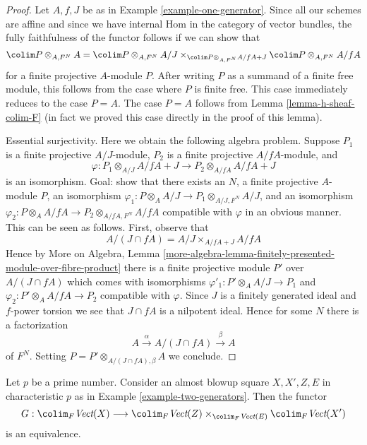 \begin{proof}
Let $A, f, J$ be as in Example \ref{example-one-generator}.
Since all our schemes are affine and since we have internal
Hom in the category of vector bundles, the fully faithfulness
of the functor follows if we can show that
$$
\colim P \otimes_{A, F^N} A =
\colim P \otimes_{A, F^N} A/J
\times_{\colim P \otimes_{A, F^N} A/fA + J}
\colim P \otimes_{A, F^N} A/fA
$$
for a finite projective $A$-module $P$. After writing $P$ as a summand
of a finite free module, this follows from the case where $P$ is finite
free. This case immediately reduces to the case $P = A$. The case
$P = A$ follows from Lemma \ref{lemma-h-sheaf-colim-F}
(in fact we proved this case directly in the proof of this lemma).

\medskip\noindent
Essential surjectivity. Here we obtain the following algebra problem.
Suppose $P_1$ is a finite projective $A/J$-module,
$P_2$ is a finite projective $A/fA$-module, and
$$
\varphi :
P_1 \otimes_{A/J} A/fA + J
\longrightarrow
P_2 \otimes_{A/fA} A/fA + J
$$
is an isomorphism. Goal: show that there exists an $N$, a finite
projective $A$-module $P$, an isomorphism
$\varphi_1 : P \otimes_A A/J \to P_1 \otimes_{A/J, F^N} A/J$,
and an isomorphism
$\varphi_2 : P \otimes_A A/fA \to P_2 \otimes_{A/fA, F^N} A/fA$
compatible with $\varphi$ in an obvious manner.
This can be seen as follows. First, observe that
$$
A/(J \cap fA) = A/J \times_{A/fA + J} A/fA
$$
Hence by More on Algebra, Lemma
\ref{more-algebra-lemma-finitely-presented-module-over-fibre-product}
there is a finite projective module $P'$ over
$A/(J \cap fA)$ which comes with isomorphisms
$\varphi'_1 : P' \otimes_A A/J \to P_1$ and
$\varphi_2 : P' \otimes_A A/fA \to P_2$
compatible with $\varphi$. Since $J$ is a finitely generated ideal and
$f$-power torsion we see that $J \cap fA$ is a nilpotent
ideal. Hence for some $N$ there is a factorization
$$
A \xrightarrow{\alpha} A/(J \cap fA) \xrightarrow{\beta} A
$$
of $F^N$. Setting $P = P' \otimes_{A/(J \cap fA), \beta} A$
we conclude.
\end{proof}

\begin{lemma}
\label{lemma-vector-bundle-II}
Let $p$ be a prime number. Consider an almost blowup square $X, X', Z, E$
in characteristic $p$ as in Example \ref{example-two-generators}.
Then the functor
$$
G :
\colim_F \textit{Vect}(X)
\longrightarrow
\colim_F \textit{Vect}(Z)
\times_{\colim_F \textit{Vect}(E)}
\colim_F \textit{Vect}(X')
$$
is an equivalence.
\end{lemma}

